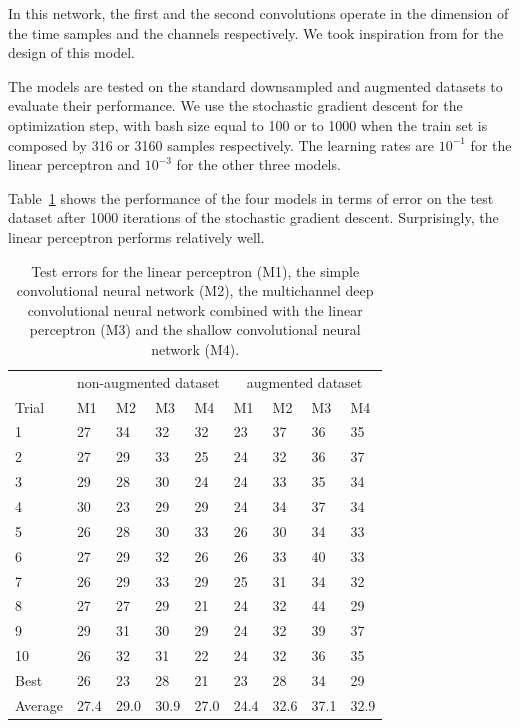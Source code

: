 \documentclass{article}
\begin{document}
\begin{itemize}
In this network, the first and the second convolutions operate in the dimension of the time samples and the channels respectively. We took inspiration from \cite{schirrmeister2017deep} for the design of this model.
\end{itemize}
The models are tested on the standard downsampled and augmented datasets to evaluate their performance. We use the stochastic gradient descent for the optimization step, with bash size equal to 100 or to 1000 when the train set is composed by 316 or 3160 samples respectively. The learning rates are $10^{-1}$ for the linear perceptron and $10^{-3}$ for the other three models.

Table~\ref{tab_results} shows the performance of the four models in terms of error on the test dataset after 1000 iterations of the stochastic gradient descent. Surprisingly, the linear perceptron performs relatively well.

 \begin{table}
 \begin{center}
    \begin{tabular}{ l l l l l l l l l}
\toprule
     $ $ & \multicolumn{4}{c}{non-augmented dataset} & \multicolumn{4}{c}{augmented dataset} \\
     \cmidrule(lr){2-5}
     \cmidrule(lr){6-9}
    Trial & M1 & M2 & M3 & M4 & M1 & M2 & M3 & M4  \\
\midrule
    1 & 27 & 34 & 32 & 32 & 23 & 37 & 36 & 35 \\
    2 & 27 & 29 & 33 & 25 & 24 & 32 & 36 & 37 \\
    3 & 29 & 28 & 30 & 24 & 24 & 33 & 35 & 34\\
    4 & 30 & 23 & 29 & 29 & 24 & 34 & 37 & 34\\
    5 & 26 & 28 & 30 & 33 & 26 & 30 & 34 & 33\\
    6 & 27 & 29 & 32 & 26 & 26 & 33 & 40 & 33\\
    7 & 26 & 29 & 33 & 29 & 25 & 31 & 34 & 32\\
    8 & 27 & 27 & 29 & 21 & 24 & 32 & 44 & 29\\
    9 & 29 & 31 & 30 & 29 & 24 & 32 & 39 & 37 \\
    10 & 26 & 32 & 31 & 22 & 24 & 32 & 36 & 35\\
    \midrule
    Best & 26 & 23 & 28 & 21 & 23 & 28 & 34 & 29 \\
    Average & 27.4 & 29.0 & 30.9 & 27.0 & 24.4 & 32.6 & 37.1 & 32.9 \\
\bottomrule
    \end{tabular}
        \caption{Test errors for the linear perceptron (M1), the simple convolutional neural network (M2), the multichannel deep convolutional neural network combined with the linear perceptron (M3) and the shallow convolutional neural network (M4).}
\end{center}
\label{tab_results}
\end{table}
\end{document}
